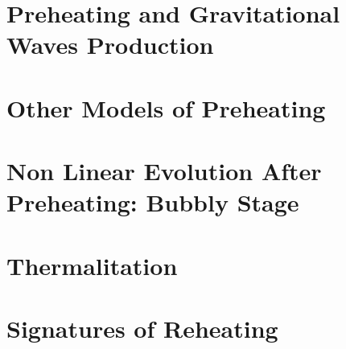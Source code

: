 \documentclass[11pt,a4paper,twoside]{book}
\begin{document}
\chapter{Preheating and Gravitational Waves Production}

\chapter{Other Models of Preheating}

\chapter{Non Linear Evolution After Preheating: Bubbly Stage}

\chapter{Thermalitation}

\chapter{Signatures of Reheating}
\end{document}
